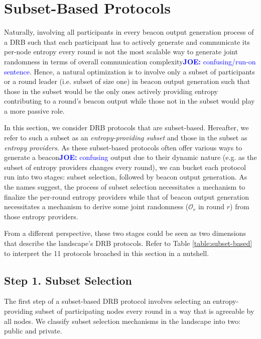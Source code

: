 \documentclass[letterpaper,twocolumn,10pt]{article}
\theoremstyle{definition}
\theoremstyle{remark}
\newcommand{\joenote}[1]{\textcolor{blue}{\textbf{JOE:} #1}}
\begin{document}
\section{Subset-Based Protocols}
\label{section:subset-based}
Naturally, involving all participants in every beacon output generation process of a DRB such that each participant has to actively generate and communicate its per-node entropy every round is not the most scalable way to generate joint randomness in terms of overall communication complexity\joenote{confusing/run-on sentence}. Hence, a natural optimization is to involve only a subset of participants or a round leader (i.e. subset of size one) in beacon output generation such that those in the subset would be the only ones actively providing entropy contributing to a round's beacon output while those not in the subset would play a more passive role.

In this section, we consider DRB protocols that are subset-based. Hereafter, we refer to such a subset as an \textit{entropy-providing subset} and those in the subset as \textit{entropy providers}. As these subset-based protocols often offer various ways to generate a beacon\joenote{confusing} output due to their dynamic nature (e.g. as the subset of entropy providers changes every round), we can bucket each protocol run into two stages: subset selection, followed by beacon output generation. As the names suggest, the process of subset selection necessitates a mechanism to finalize the per-round entropy providers while that of beacon output generation necessitates a mechanism to derive some joint randomness ($\mathcal{O}_r$ in round $r$) from those entropy providers.

From a different perspective, these two stages could be seen as two dimensions that describe the landscape's DRB protocols. Refer to Table \ref{table:subset-based} to interpret the 11 protocols broached in this section in a nutshell.

\subsection{Step 1. Subset Selection}
The first step of a subset-based DRB protocol involves selecting an entropy-providing subset of participating nodes every round in a way that is agreeable by all nodes. We classify subset selection mechanisms in the landscape into two: public and private.
\end{document}
